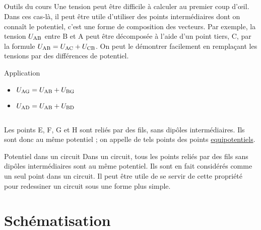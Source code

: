 \documentclass[../main/main.tex]{subfiles}
\begin{document}
\subsection{}
\begin{NCdemo}{Outils du cours}
    Une tension peut être difficile à calculer au premier coup d'œil. Dans
    ces cas-là, il peut être utile d'utiliser des points intermédiaires dont on
    connaît le potentiel, c'est une forme de composition des vecteurs. Par
    exemple, la tension $U_{\rm AB}$ entre B et A peut être décomposée à l'aide
    d'un point tiers, C, par la formule $U_{\rm AB} = U_{\rm AC} + U_{\rm CB}$.
    On peut le démontrer facilement en remplaçant les tensions par des
    différences de potentiel.
\end{NCdemo}

\begin{NCexem}{Application}
    \begin{itemize}
        \item $U_{\rm AG} = U_{\rm AB} + U_{\rm BG}$
        \item $U_{\rm AD} = U_{\rm AB} + U_{\rm BD}$
    \end{itemize}
\end{NCexem}

\subsection{}
Les points E, F, G et H sont reliés par des fils, sans dipôles intermédiaires.
Ils sont donc au même potentiel ; on appelle de tels points des points
\underline{equipotentiels}.

\begin{impo}{Potentiel dans un circuit}\label{def:potentiel}
    Dans un circuit, tous les points reliés par des fils sans dipôles
    intermédiaires sont au même potentiel. Ils sont en fait considérés comme un
    seul point dans un circuit. Il peut être utile de se servir de cette
    propriété pour redessiner un circuit sous une forme plus simple.
\end{impo}

\section{Schématisation}
\end{document}

